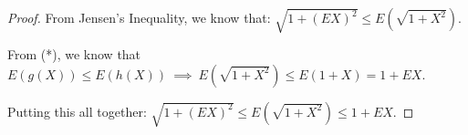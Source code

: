 \documentclass[12pt,letterpaper, onecolumn]{exam}
\begin{document}
\begin{questions}
\begin{solution}
\begin{proof}
    From Jensen's Inequality, we know that: $\sqrt{1 + (EX)^2} \leq E(\sqrt{1 + X^2})$. 

    From (*), we know that $E(g(X)) \leq E(h(X)) \: \implies \: E(\sqrt{1 + X^2}) \leq E(1 + X) = 1 +EX$. 

    Putting this all together: $\sqrt{1 + (EX)^2} \leq E(\sqrt{1 + X^2}) \leq 1 + EX$.
    \end{proof}
    \end{solution}

\end{questions}
\end{document}
